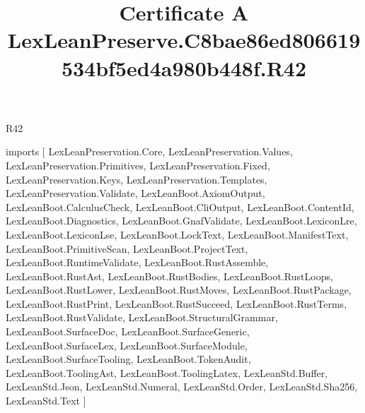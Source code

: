 \begin{lexlean}{R42}
\title{Certificate A LexLeanPreserve.C8bae86ed806619534bf5ed4a980b448f.R42}
\begin{coremodule}
imports [
  LexLeanPreservation.Core,
  LexLeanPreservation.Values,
  LexLeanPreservation.Primitives,
  LexLeanPreservation.Fixed,
  LexLeanPreservation.Keys,
  LexLeanPreservation.Templates,
  LexLeanPreservation.Validate,
  LexLeanBoot.AxiomOutput,
  LexLeanBoot.CalculusCheck,
  LexLeanBoot.CliOutput,
  LexLeanBoot.ContentId,
  LexLeanBoot.Diagnostics,
  LexLeanBoot.GnafValidate,
  LexLeanBoot.LexiconLre,
  LexLeanBoot.LexiconLse,
  LexLeanBoot.LockText,
  LexLeanBoot.ManifestText,
  LexLeanBoot.PrimitiveScan,
  LexLeanBoot.ProjectText,
  LexLeanBoot.RuntimeValidate,
  LexLeanBoot.RustAssemble,
  LexLeanBoot.RustAst,
  LexLeanBoot.RustBodies,
  LexLeanBoot.RustLoops,
  LexLeanBoot.RustLower,
  LexLeanBoot.RustMoves,
  LexLeanBoot.RustPackage,
  LexLeanBoot.RustPrint,
  LexLeanBoot.RustSucceed,
  LexLeanBoot.RustTerms,
  LexLeanBoot.RustValidate,
  LexLeanBoot.StructuralGrammar,
  LexLeanBoot.SurfaceDoc,
  LexLeanBoot.SurfaceGeneric,
  LexLeanBoot.SurfaceLex,
  LexLeanBoot.SurfaceModule,
  LexLeanBoot.SurfaceTooling,
  LexLeanBoot.TokenAudit,
  LexLeanBoot.ToolingAst,
  LexLeanBoot.ToolingLatex,
  LexLeanStd.Buffer,
  LexLeanStd.Json,
  LexLeanStd.Numeral,
  LexLeanStd.Order,
  LexLeanStd.Sha256,
  LexLeanStd.Text
]


\end{coremodule}
\end{lexlean}
